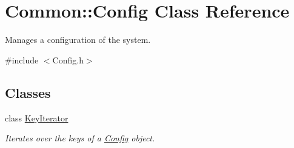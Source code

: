 \hypertarget{class_common_1_1_config}{\section{Common\-:\-:Config Class Reference}
\label{class_common_1_1_config}
}


Manages a configuration of the system.  




{\ttfamily \#include $<$Config.\-h$>$}

\subsection*{Classes}
\begin{DoxyCompactItemize}
\item 
class \hyperlink{class_common_1_1_config_1_1_key_iterator}{Key\-Iterator}
\begin{DoxyCompactList}\small\item\em Iterates over the keys of a \hyperlink{class_common_1_1_config}{Config} object. \end{DoxyCompactList}\end{DoxyCompactItemize}
